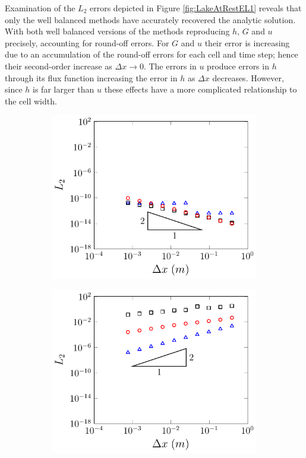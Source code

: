 Examination of the $L_2$ errors depicted in Figure \ref{fig:LakeAtRestEL1} reveals that only the well balanced methods have accurately recovered the analytic solution. With both well balanced versions of the methods reproducing $h$, $G$ and $u$ precisely, accounting for round-off errors. For $G$ and $u$ their error is increasing due to an accumulation of the round-off errors for each cell and time step; hence their second-order increase as $\Delta x \rightarrow 0$. The errors in $u$ produce errors in $h$ through its flux function increasing the error in $h$ as $\Delta x$ decreases. However, since $h$ is far larger than $u$ these effects have a more complicated relationship to the cell width.

\begin{figure}
	\centering
	\begin{subfigure}{0.5\textwidth}
		\includegraphics[width=\textwidth]{./chp5/figures/Analytic/LakeAtRest/L2/FEVMWB.pdf}
		\vspace{0.3cm}
	\end{subfigure}%
	\begin{subfigure}{0.5\textwidth}
		\includegraphics[width=\textwidth]{./chp5/figures/Analytic/LakeAtRest/L2/FEVMnWB.pdf}

\end{subfigure}
\end{figure}
